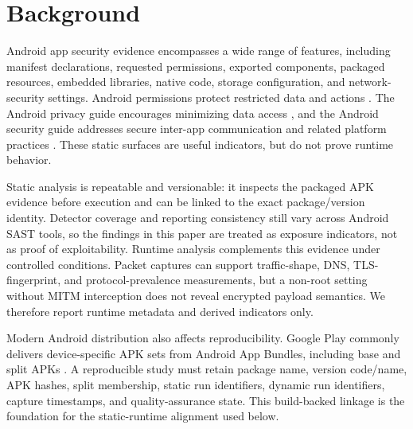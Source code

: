 \section{Background}

Android app security evidence encompasses a wide range of features, including manifest declarations, requested permissions, exported components, packaged resources, embedded libraries, native code, storage configuration, and network-security settings. Android permissions protect restricted data and actions \cite{androidPermissions2026}. The Android privacy guide encourages minimizing data access \cite{androidPrivacyChecklist2026}, and the Android security guide addresses secure inter-app communication and related platform practices \cite{androidSecurityBestPractices2026}. These static surfaces are useful indicators, but do not prove runtime behavior.

Static analysis is repeatable and versionable: it inspects the packaged APK evidence before execution and can be linked to the exact package/version identity. Detector coverage and reporting consistency still vary across Android SAST tools, so the findings in this paper are treated as exposure indicators, not as proof of exploitability. Runtime analysis complements this evidence under controlled conditions. Packet captures can support traffic-shape, DNS, TLS-fingerprint, and protocol-prevalence measurements, but a non-root setting without MITM interception does not reveal encrypted payload semantics. We therefore report runtime metadata and derived indicators only.

Modern Android distribution also affects reproducibility. Google Play commonly delivers device-specific APK sets from Android App Bundles, including base and split APKs \cite{androidAppBundles2026}. A reproducible study must retain package name, version code/name, APK hashes, split membership, static run identifiers, dynamic run identifiers, capture timestamps, and quality-assurance state. This build-backed linkage is the foundation for the static-runtime alignment used below.
